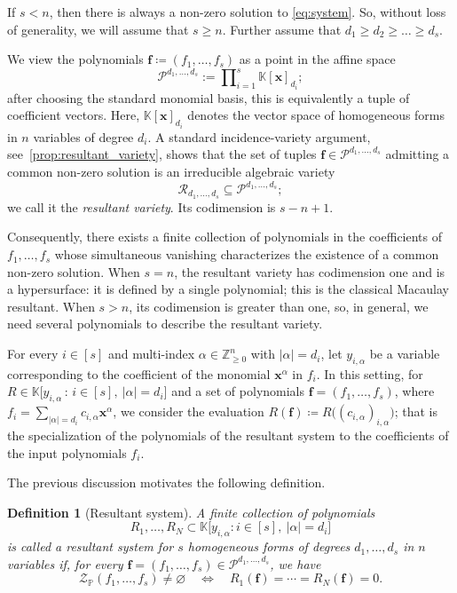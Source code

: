 \documentclass[11pt,a4paper]{article}
\newtheorem{definition}[theorem]{Definition}\AddToHook{env/definition/begin}{\crefalias{theorem}{definition}}
\numberwithin{equation}{section}
\newcommand{\PP}{\mathbb{P}}
\newcommand{\ZZ}{\mathbb{Z}}
\newcommand{\KK}{\mathbb{K}}
\newcommand{\cR}{\mathcal{R}}
\newcommand{\cP}{\mathcal{P}}
\newcommand{\cZ}{\mathcal{Z}}
\newcommand{\xx}{\ensuremath{\boldsymbol{x}}}
\newcommand{\ff}{\ensuremath{\boldsymbol{f}}}
\begin{document}
If $s< n$, then there is always a non-zero solution to \eqref{eq:system}.
So, without loss of generality, we will assume  that $s\geq n$.
Further assume that $d_1\geq d_2\geq\dots\geq d_s$.

We view the polynomials $\ff\coloneqq(f_1,\ldots,f_s)$ as a point in the affine space
\[
	\cP^{d_1,\ldots,d_s} := \prod\nolimits_{i=1}^s \KK[\xx]_{d_i};
\]
after choosing the standard monomial basis, this is equivalently a tuple of coefficient vectors.
Here, $\KK[\xx]_{d_i}$ denotes the vector space of homogeneous forms 
in $n$ variables of degree $d_i$. 
A standard incidence-variety argument,
see~\cref{prop:resultant_variety}, shows that the set of tuples 
$\ff\in\cP^{d_1,\ldots,d_s}$ admitting a common non-zero solution 
is an irreducible algebraic variety
\[
	\cR_{d_1,\ldots,d_s} \subseteq \cP^{d_1,\ldots,d_s};
\]
we call it the \emph{resultant variety}. Its codimension is $s-n+1$.

Consequently, there exists a finite collection of polynomials 
in the coefficients of $f_1,\ldots,f_s$ whose simultaneous vanishing
characterizes the existence of a common non-zero solution. 
When $s=n$, the resultant variety has codimension one and 
is a hypersurface: it is defined by a single polynomial;
this is the classical Macaulay resultant. 
When $s>n$, its codimension is greater than one, so, in general,
we need several polynomials to describe the resultant variety.



For every $i \in[s]$ and  multi-index $\alpha\in\ZZ_{\geq 0}^n$
with $|\alpha|=d_i$, let $y_{i,\alpha}$ be a variable corresponding
to the coefficient of the monomial $\xx^\alpha$ in $f_i$.
In this setting, for
$R \in \KK\bigl[y_{i,\alpha} \,:\, i\in[s],\ |\alpha| = d_i ]$
and a set of polynomials $\ff=(f_1,\ldots,f_s)$,
where $f_i=\sum_{|\alpha|=d_i}c_{i,\alpha}\xx^\alpha$,
we consider the evaluation
$R(\ff)\coloneqq R\bigl((c_{i,\alpha})_{i,\alpha}\bigr)$;
that is the specialization of the polynomials of the resultant system
to the coefficients of the input polynomials $f_i$.


The previous discussion motivates the following definition.

\begin{definition}[Resultant system]
	\label{def:resultant-system}
A finite collection of polynomials
\[
	R_1,\ldots,R_N
	\subset
	\KK\big[y_{i,\alpha}:i\in[s],\ |\alpha|=d_i\big]
\]
is called a \emph{resultant system} for $s$ homogeneous forms 
of degrees $d_1,\ldots,d_s$ in $n$ variables if, 
for every $\ff=(f_1,\ldots,f_s)\in\cP^{d_1,\ldots,d_s}$, we have
\[
	\cZ_{\PP}(f_1,\ldots,f_s)\neq\varnothing
	\quad\Longleftrightarrow\quad
	R_1(\ff)=\cdots=R_N(\ff)=0.
\]
\end{definition}
\end{document}
